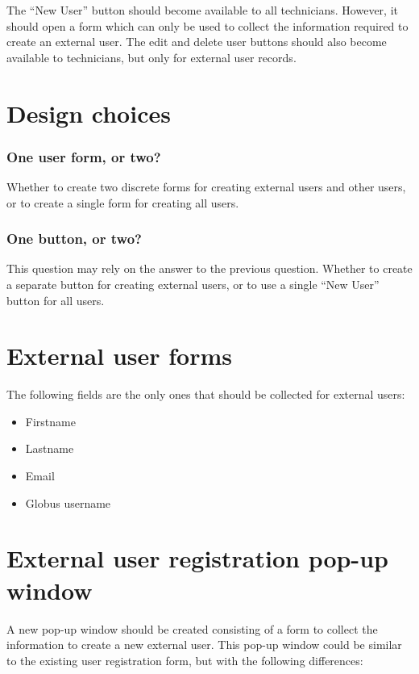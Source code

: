 The ``New User'' button should become available to all technicians. However, it should
open a form which can only be used to collect the information required to create an
external user. The edit and delete user buttons should also become available to 
technicians, but only for external user records.

\section{Design choices}

\subsubsection{One user form, or two?}

Whether to create two discrete forms for creating external users and other
users, or to create a single form for creating all users.

\subsubsection{One button, or two?}

This question may rely on the answer to the previous question.
Whether to create a separate button for creating external users, or to
use a single ``New User'' button for all users.

\section{External user forms}

The following fields are the only ones that should be collected for external users:

\begin{itemize}\itemsep1pt
    \item Firstname
    \item Lastname
    \item Email
    \item Globus username
\end{itemize}

\section{External user registration pop-up window}

A new pop-up window should be created consisting of a form to collect the information 
to create a new external user. This pop-up window could be similar to the existing user 
registration form, but with the following differences:


